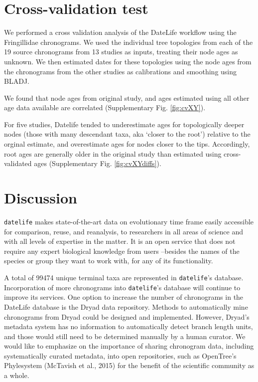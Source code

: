 \documentclass[
  english,
  man]{apa6}
\begin{document}
\hypertarget{cross-validation-test}{%
\section{Cross-validation test}\label{cross-validation-test}}

We performed a cross validation analysis of the DateLife workflow using the Fringillidae chronograms.
We used the individual tree topologies from each of the 19 source chronograms from 13 studies as inputs, treating their node ages as unknown.
We then estimated dates for these topologies using the node ages from the chronograms from the other studies as calibrations and smoothing using BLADJ.

We found that node ages from original study, and ages estimated using all other age data available are correlated (Supplementary Fig. \ref{fig:cvXY}).

For five studies, Datelife tended to underestimate ages for topologically deeper nodes (those with many descendant taxa, aka `closer to the root') relative to the orginal estimate, and overestimate ages for nodes closer to the tips.
Accordingly, root ages are generally older in the original study than estimated using cross-validated ages (Supplementary Fig. \ref{fig:cvXYdiffs}).

\hypertarget{discussion}{%
\section{Discussion}\label{discussion}}

\texttt{datelife} makes state-of-the-art data on evolutionary time frame easily accessible for comparison, reuse, and reanalysis, to researchers in all areas of science and with all levels of expertise in the matter. It is an open service that does not require any expert biological knowledge from users --besides the names of the species or group they want to work with, for any of its functionality.

A total of 99474 unique terminal taxa are represented in \texttt{datelife}'s database.
Incorporation of more chronograms into \texttt{datelife}'s database will continue to improve its services. One option to increase the number of chronograms in the DateLife database is the Dryad data repository. Methods to automatically mine chronograms from Dryad could be designed and implemented. However, Dryad's metadata system has no information to automatically detect branch length units, and those would still need to be determined manually by a human curator.
We would like to emphasize on the importance of sharing chronogram data, including systematically curated metadata, into open repositories, such as OpenTree's Phylesystem (McTavish et al., 2015) for the benefit of the scientific community as a whole.
\end{document}
